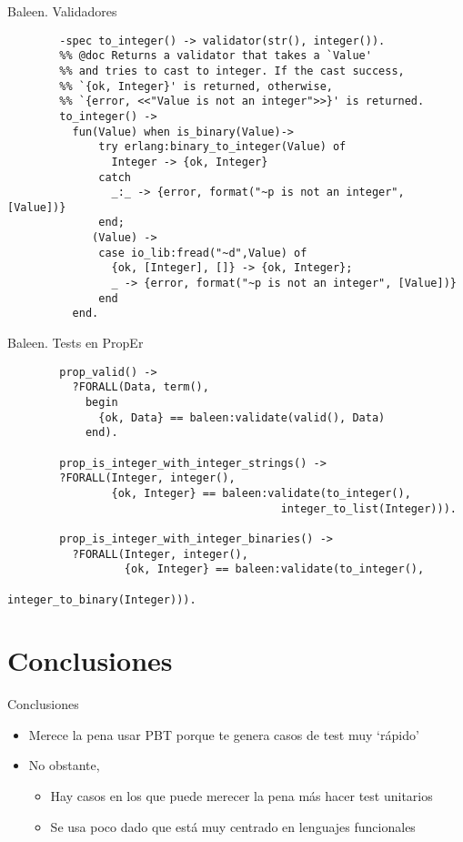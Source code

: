 \documentclass{beamer}
\begin{document}
    \begin{frame}[fragile]{Baleen. Validadores}
      \begin{verbatim}
        -spec to_integer() -> validator(str(), integer()).
        %% @doc Returns a validator that takes a `Value'
        %% and tries to cast to integer. If the cast success,
        %% `{ok, Integer}' is returned, otherwise,
        %% `{error, <<"Value is not an integer">>}' is returned.
        to_integer() ->
          fun(Value) when is_binary(Value)->
              try erlang:binary_to_integer(Value) of
                Integer -> {ok, Integer}
              catch
                _:_ -> {error, format("~p is not an integer", [Value])}
              end;
             (Value) ->
              case io_lib:fread("~d",Value) of
                {ok, [Integer], []} -> {ok, Integer};
                _ -> {error, format("~p is not an integer", [Value])}
              end
          end.
      \end{verbatim}
    \end{frame}

    \begin{frame}[fragile]{Baleen. Tests en PropEr}
      \begin{verbatim}
        prop_valid() ->
          ?FORALL(Data, term(),
            begin
              {ok, Data} == baleen:validate(valid(), Data)
            end).

        prop_is_integer_with_integer_strings() ->
        ?FORALL(Integer, integer(),
                {ok, Integer} == baleen:validate(to_integer(),
                                          integer_to_list(Integer))).

        prop_is_integer_with_integer_binaries() ->
          ?FORALL(Integer, integer(),
                  {ok, Integer} == baleen:validate(to_integer(),
                                          integer_to_binary(Integer))).
      \end{verbatim}
    \end{frame}

  \section{Conclusiones}
    \begin{frame}{Conclusiones}
      \begin{itemize}
        \item Merece la pena usar PBT porque te genera casos de test muy `rápido'
        \item No obstante,
        \begin{itemize}
          \item Hay casos en los que puede merecer la pena más hacer test unitarios
          \item Se usa poco dado que está muy centrado en lenguajes funcionales
        \end{itemize}
      \end{itemize}
    \end{frame}
\end{document}
